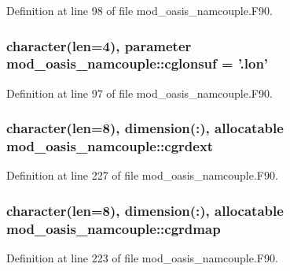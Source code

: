 Definition at line 98 of file mod\+\_\+oasis\+\_\+namcouple.\+F90.

\hypertarget{classmod__oasis__namcouple_ac1a557cecb41295e7d5cb004a7937ea4}{
\subsubsection[{cglonsuf}]{\setlength{\rightskip}{0pt plus 5cm}character(len=4), parameter mod\+\_\+oasis\+\_\+namcouple\+::cglonsuf = '.lon'\hspace{0.3cm}{\ttfamily [private]}}}\label{classmod__oasis__namcouple_ac1a557cecb41295e7d5cb004a7937ea4}


Definition at line 97 of file mod\+\_\+oasis\+\_\+namcouple.\+F90.

\hypertarget{classmod__oasis__namcouple_a5db101d0bffaf6fbd5ae10d1d0069108}{
\subsubsection[{cgrdext}]{\setlength{\rightskip}{0pt plus 5cm}character(len=8), dimension(\+:), allocatable mod\+\_\+oasis\+\_\+namcouple\+::cgrdext\hspace{0.3cm}{\ttfamily [private]}}}\label{classmod__oasis__namcouple_a5db101d0bffaf6fbd5ae10d1d0069108}


Definition at line 227 of file mod\+\_\+oasis\+\_\+namcouple.\+F90.

\hypertarget{classmod__oasis__namcouple_affa01947af89e5cdad5f33fba2a53d22}{
\subsubsection[{cgrdmap}]{\setlength{\rightskip}{0pt plus 5cm}character(len=8), dimension(\+:), allocatable mod\+\_\+oasis\+\_\+namcouple\+::cgrdmap\hspace{0.3cm}{\ttfamily [private]}}}\label{classmod__oasis__namcouple_affa01947af89e5cdad5f33fba2a53d22}


Definition at line 223 of file mod\+\_\+oasis\+\_\+namcouple.\+F90.

